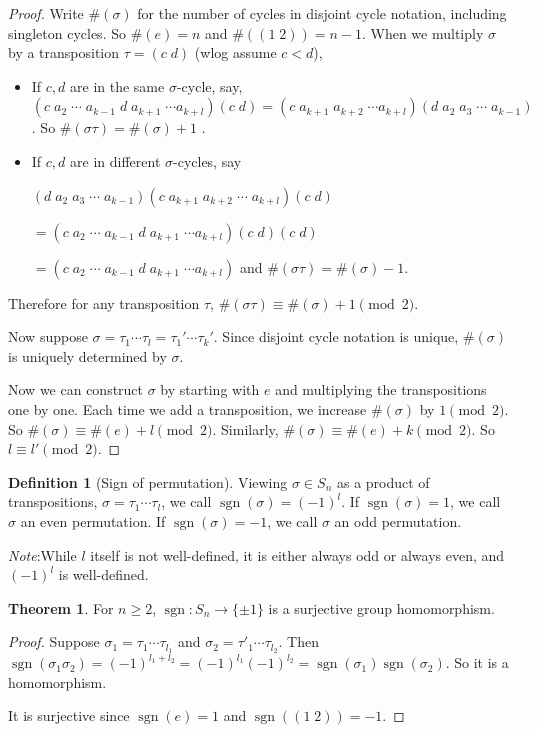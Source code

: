 \documentclass[a4paper]{article}
\theoremstyle{definition}
\newtheorem*{thm}{Theorem}
\newtheorem*{defi}{Definition}
\newcommand{\note}{\noindent \emph{Note}:\;}
\DeclareMathOperator\sgn{sgn}
\begin{document}
\begin{proof}
  Write $\#(\sigma)$ for the number of cycles in disjoint cycle notation, including singleton cycles. So $\#(e) = n$ and $\#((1\; 2)) = n - 1$. When we multiply $\sigma$ by a transposition $\tau = (c\; d)$ (wlog assume $c < d$),
  \begin{itemize}
  \item If $c, d$ are in the same $\sigma$-cycle, say, $(c\; a_2\; \cdots \; a_{k - 1}\; d\; a_{k + 1}\; \cdots a_{k + l})(c\; d) = (c\; a_{k+1}\; a_{k+2}\;\cdots a_{k + l})(d\; a_2\; a_3\;\cdots\; a_{k - 1})$. So $\#(\sigma\tau) = \#(\sigma) + 1$ .
  \item If $c, d$ are in different $\sigma$-cycles, say

$(d\; a_2\; a_3\;\cdots\;a_{k - 1})(c\; a_{k + 1}\; a_{k + 2}\;\cdots\; a_{k + l})(c\; d) $

$=(c\; a_2\; \cdots \; a_{k - 1}\; d\; a_{k + 1}\; \cdots a_{k + l})(c\; d)(c\; d)$

$= (c\; a_2\; \cdots \; a_{k - 1}\; d\; a_{k + 1}\; \cdots a_{k + l})$ and $\#(\sigma\tau) = \#(\sigma) - 1$.

  \end{itemize}
  Therefore for any transposition $\tau$, $\#(\sigma\tau) \equiv \#(\sigma) + 1 \pmod 2$. 

  Now suppose $\sigma = \tau_1\cdots\tau_l = \tau_1'\cdots\tau_{k}'$. Since disjoint cycle notation is unique, $\#(\sigma)$ is uniquely determined by $\sigma$. 

  Now we can construct $\sigma$ by starting with $e$ and multiplying the transpositions one by one. Each time we add a transposition, we increase $\#(\sigma)$ by $1 \pmod 2$. So $\#(\sigma) \equiv \#(e) + l\pmod 2$. Similarly, $\#(\sigma) \equiv \#(e) + k \pmod 2$. So $l \equiv l' \pmod 2$.
\end{proof}

\begin{defi}[Sign of permutation]
  Viewing $\sigma\in S_n$ as a product of transpositions, $\sigma = \tau_1\cdots \tau_l$, we call $\sgn(\sigma) = (-1)^l$. If $\sgn(\sigma) = 1$, we call $\sigma$ an even permutation. If $\sgn(\sigma) = -1$, we call $\sigma$ an odd permutation.
\end{defi}
\note While $l$ itself is not well-defined, it is either always odd or always even, and $(-1)^l$ is well-defined.

\begin{thm}
  For $n\geq 2$, $\sgn : S_n \rightarrow \{\pm 1\}$ is a surjective group homomorphism. 
\end{thm}
\begin{proof}
  Suppose $\sigma_1 = \tau_1\cdots \tau_{l_1}$ and $\sigma_2 = \tau'_1\cdots \tau_{l_2}$. Then $\sgn(\sigma_1\sigma_2) = (-1)^{l_1 + l_2} = (-1)^{l_1}(-1)^{l_2} = \sgn(\sigma_1)\sgn(\sigma_2)$. So it is a homomorphism.

It is surjective since $\sgn(e) = 1$ and $\sgn((1\; 2)) = -1$.
\end{proof}
\end{document}
